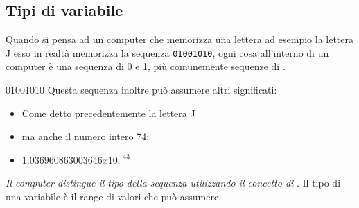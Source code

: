 \subsection*{Tipi di variabile}


\begin{frame}


\begin{block}{}
Quando si pensa ad un computer che memorizza una lettera ad esempio la lettera J esso in realtà memorizza la sequenza 
\texttt{01001010}, ogni cosa all'interno di un computer è una sequenza di 0 e 1, più comunemente sequenze di .
\end{block}
\begin{block}{01001010}
Questa sequenza inoltre può assumere altri significati:
\begin{itemize}
\item Come detto precedentemente la lettera J
\item ma anche il numero intero 74;
\item $1.036960863003646 x 10^{-43}$
\end{itemize}
\end{block}
\begin{block}{}
\textit{Il computer distingue il tipo della sequenza utilizzando il concetto di }. Il tipo di una variabile è
il range di valori che può assumere.
\end{block}
\end{frame}


